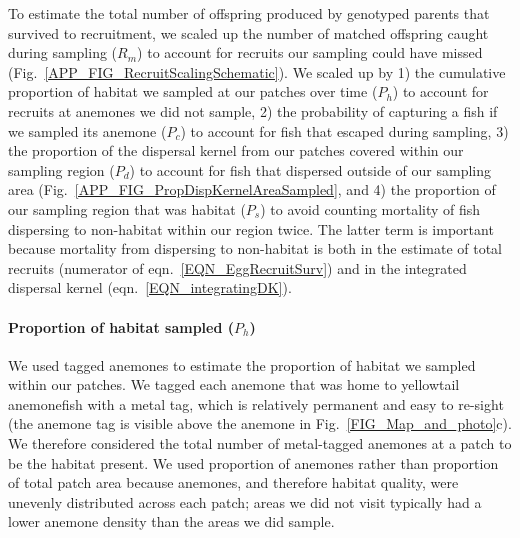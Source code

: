 \documentclass[12pt, oneside]{article}   	%
\begin{document}
To estimate the total number of offspring produced by genotyped parents that survived to recruitment, we scaled up the number of matched offspring caught during sampling ($R_m$) to account for recruits our sampling could have missed (Fig.\ \ref{APP_FIG_RecruitScalingSchematic}). We scaled up by 1) the cumulative proportion of habitat we sampled at our patches over time ($P_h$) to account for recruits at anemones we did not sample, 2) the probability of capturing a fish if we sampled its anemone ($P_c$) to account for fish that escaped during sampling, 3) the proportion of the dispersal kernel from our patches covered within our sampling region ($P_d$) to account for fish that dispersed outside of our sampling area (Fig.\ \ref{APP_FIG_PropDispKernelAreaSampled}, and 4) the proportion of our sampling region that was habitat ($P_s$) to avoid counting mortality of fish dispersing to non-habitat within our region twice. The latter term is important because mortality from dispersing to non-habitat is both in the estimate of total recruits (numerator of eqn.\ \ref{EQN_EggRecruitSurv}) and in the integrated dispersal kernel (eqn.\ \ref{EQN_integratingDK}). %

\paragraph*{Proportion of habitat sampled ($P_h$)} %

We used tagged anemones to estimate the proportion of habitat we sampled within our patches. We tagged each anemone that was home to yellowtail anemonefish with a metal tag, which is relatively permanent and easy to re-sight (the anemone tag is visible above the anemone in Fig.\ \ref{FIG_Map_and_photo}c). We therefore considered the total number of metal-tagged anemones at a patch to be the habitat present. We used proportion of anemones rather than proportion of total patch area because anemones, and therefore habitat quality, were unevenly distributed across each patch; areas we did not visit typically had a lower anemone density than the areas we did sample. %
\end{document}
